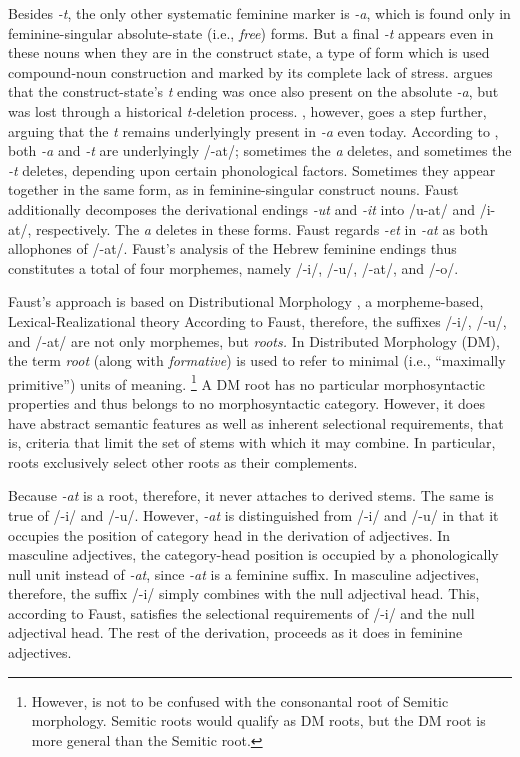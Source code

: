 Besides \textit{-t}, the only other systematic feminine marker is 
\textit{-a}, which is found only 
in feminine-singular absolute-state (i.e., \emph{free}) forms. %
But a final \textit{-t} appears even in these nouns when they are 
in the construct state, a type of form which is used compound-noun 
construction and marked by its complete lack of stress.
\cite{schwarzwald:1982} argues that
the construct-state's \textit{t} ending was once also 
present on the absolute \textit{-a}, but was lost through a historical
\textit{t-}deletion process. \cite{faust:2013}, however, 
goes a step further, arguing that the \textit{t} remains 
underlyingly present in \textit{-a} even today. According 
to \cite{faust:2013}, both
\textit{-a} and \textit{-t} are underlyingly /-at/; sometimes 
the \textit{a} deletes, and sometimes the \textit{-t} deletes, depending 
upon certain phonological factors. Sometimes they appear 
together in the same form, as in feminine-singular construct nouns.
 Faust additionally decomposes the derivational endings 
\textit{-ut} and \textit{-it} into /u-at/ and /i-at/, respectively. 
The \textit{a} deletes in these forms.
Faust regards \textit{-et} in \textit{-at} as both allophones of /-at/. 
Faust's analysis of the Hebrew feminine endings thus constitutes a total of 
four morphemes, namely /-i/, /-u/, /-at/, and /-o/.
    
Faust's approach is based on Distributional Morphology 
 \citep{halle-and-marantz:1993}, 
a morpheme-based, Lexical-Realizational theory \citep{stump:2001}
According to Faust, therefore, the suffixes /-i/, /-u/, and /-at/ are not only morphemes, 
but \emph{roots.}
In Distributed Morphology (DM), the term \emph{root} (along with \emph{formative}) is used to refer 
to minimal (i.e., ``maximally primitive'') units of meaning. \footnote{However, is not to be confused with the 
consonantal root of Semitic morphology. Semitic roots would qualify as 
DM roots, but the DM root is more general than the Semitic root.}
A DM root has no particular morphosyntactic properties and thus belongs to 
no morphosyntactic category.
However, it does have abstract semantic features as well as inherent 
selectional requirements, that is, criteria that limit the set of stems with which it 
may combine. In particular, roots exclusively select 
other roots as their complements.  

Because \textit{-at} is a root, therefore, it
never attaches to derived stems. The same is true of /-i/ and /-u/.  
However, \textit{-at} is distinguished from /-i/ and /-u/ in that it occupies the 
position of category head in the derivation of adjectives.
In masculine adjectives, the category-head position is occupied by a phonologically null unit instead of
\textit{-at}, since \textit{-at} is a feminine suffix. %
In masculine adjectives, therefore, the suffix /-i/ simply combines with the null adjectival head. 
This, according to Faust, satisfies the selectional requirements of /-i/
and the null adjectival head. The rest of the derivation,
proceeds as it does in feminine adjectives. 

